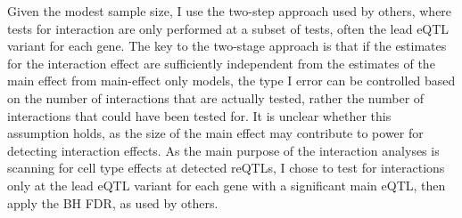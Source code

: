 %
%
Given the modest sample size, I use the two-step approach used by others\autocite{westra2015CellSpecificEQTL,peters2016InsightGenotypePhenotypeAssociations,kim-hellmuth2017GeneticRegulatoryEffects,davenport2018DiscoveringVivoCytokineeQTL},
where tests for interaction are only performed at a subset of tests, often the lead \gls{eQTL} variant for each gene.
%
%
%
The key to the two-stage approach is that if the estimates for the interaction effect are sufficiently independent from the estimates of the main effect from main-effect only models,
the type I error can be controlled based on the number of interactions that are actually tested, rather the number of interactions that could have been tested for\autocite{kooperberg2008IncreasingPowerIdentifying,peters2016InsightGenotypePhenotypeAssociations}.
It is unclear whether this assumption holds, as the size of the main effect may contribute to power for detecting interaction effects.
As the main purpose of the interaction analyses is scanning for cell type effects at detected \glspl{reQTL},
I chose to test for interactions only at the lead \gls{eQTL} variant for each gene with a significant main \gls{eQTL},
then apply the \gls{BH} \gls{FDR}, as used by others\autocite{peters2016InsightGenotypePhenotypeAssociations,kim-hellmuth2017GeneticRegulatoryEffects}.

